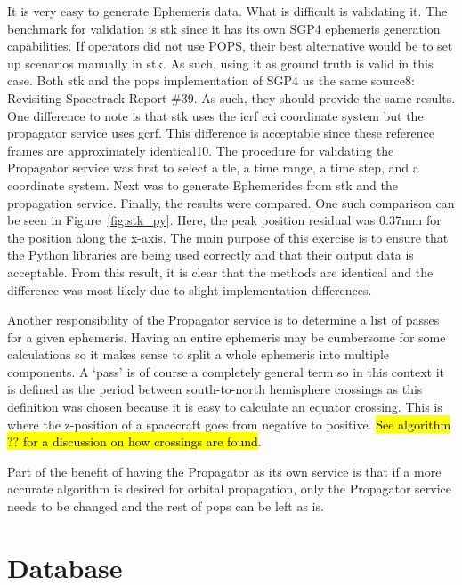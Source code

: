 It is very easy to generate Ephemeris data. What is difficult is validating it.
The benchmark for validation is \gls{stk} since it has its own SGP4 ephemeris
generation capabilities. If operators did not use POPS, their best alternative
would be to set up scenarios manually in \gls{stk}. As such, using it as ground
truth is valid in this case. Both \gls{stk} and the \gls{pops} implementation
of SGP4 us the same source8: Revisiting Spacetrack Report \#39. As such, they
should provide the same results. One difference to note is that \gls{stk} uses
the \gls{icrf} \gls{eci} coordinate system but the propagator service uses
\gls{gcrf}.  This difference is acceptable since these reference frames are
approximately identical10. The procedure for validating the Propagator service
was first to select a \gls{tle}, a time range, a time step, and a coordinate
system.  Next was to generate Ephemerides from \gls{stk} and the propagation
service.  Finally, the results were compared. One such comparison can be seen
in Figure~\ref{fig:stk_py}. Here, the peak position residual was 0.37mm for the position along
the x-axis. The main purpose of this exercise is to ensure that the Python
libraries are being used correctly and that their output data is acceptable.
From this result, it is clear that the methods are identical and the difference
was most likely due to slight implementation differences. 

Another responsibility of the Propagator service is to determine a list of
passes for a given ephemeris. Having an entire ephemeris may be cumbersome for
some calculations so it makes sense to split a whole ephemeris into multiple
components. A `pass' is of course a completely general term so in this context
it is defined as the period between south-to-north hemisphere crossings as this
definition was chosen because it is easy to calculate an equator crossing. This
is where the z-position of a spacecraft goes from negative to positive.
\hl{See algorithm ?? for a discussion on how crossings are found}.

Part of the benefit of having the Propagator as its own service is that if a
more accurate algorithm is desired for orbital propagation, only the Propagator
service needs to be changed and the rest of \gls{pops} can be left as is.



\section{Database}\label{sec:database}

